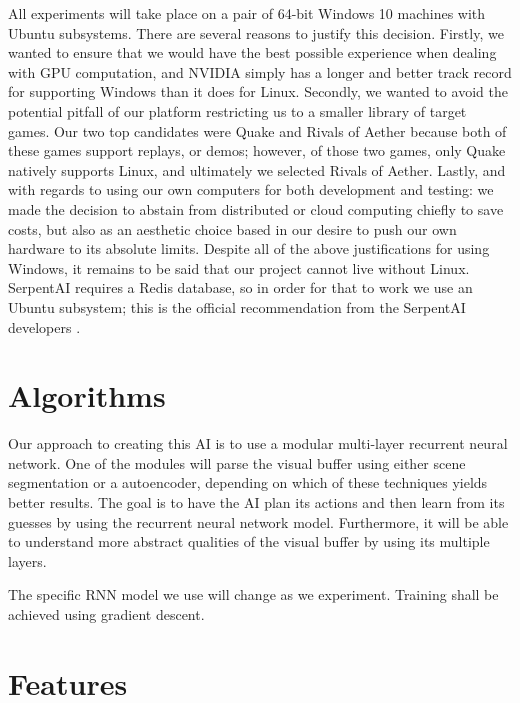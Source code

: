 All experiments will take place on a pair of 64-bit Windows 10 machines with Ubuntu subsystems. There are several reasons to justify this decision. Firstly, we wanted to ensure that we would have the best possible experience when dealing with GPU computation, and NVIDIA simply has a longer and better track record for supporting Windows than it does for Linux. Secondly, we wanted to avoid the potential pitfall of our platform restricting us to a smaller library of target games. Our two top candidates were Quake and Rivals of Aether because both of these games support replays, or demos; however, of those two games, only Quake natively supports Linux, and ultimately we selected Rivals of Aether. Lastly, and with regards to using our own computers for both development and testing: we made the decision to abstain from distributed or cloud computing chiefly to save costs, but also as an aesthetic choice based in our desire to push our own hardware to its absolute limits. Despite all of the above justifications for using Windows, it remains to be said that our project cannot live without Linux. SerpentAI requires a Redis database, so in order for that to work we use an Ubuntu subsystem; this is the official recommendation from the SerpentAI developers \cite{SerpentAI}.




\section{Algorithms}

Our approach to creating this AI is to use a modular multi-layer recurrent neural network. One of the modules will parse the visual buffer using either scene segmentation or a autoencoder, depending on which of these techniques yields better results. The goal is to have the AI plan its actions and then learn from its guesses by using the recurrent neural network model. Furthermore, it will be able to understand more abstract qualities of the visual buffer by using its multiple layers.

The specific RNN model we use will change as we experiment. Training shall be achieved using gradient descent.




\section{Features}

